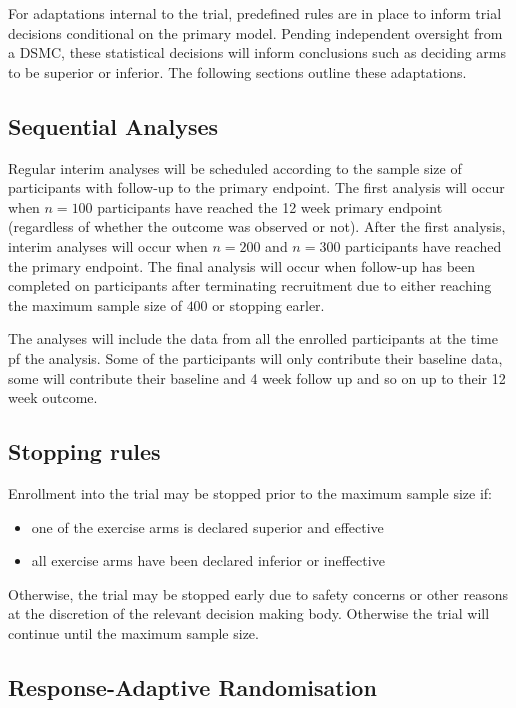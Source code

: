\documentclass[11pt,parskip=half-]{scrartcl}
\providecommand{\tightlist}{%
  \setlength{\itemsep}{0pt}\setlength{\parskip}{0pt}}
\begin{document}
For adaptations internal to the trial, predefined rules are in place to inform trial decisions conditional on the primary model. Pending independent oversight from a DSMC, these statistical decisions will inform conclusions such as deciding arms to be superior or inferior. The following sections outline these adaptations.

\subsection{Sequential Analyses}\label{sequential-analyses}

Regular interim analyses will be scheduled according to the sample size of participants with follow-up to the primary endpoint. The first analysis will occur when \(n=100\) participants have reached the 12 week primary endpoint (regardless of whether the outcome was observed or not). After the first analysis, interim analyses will occur when $n=200$ and $n=300$ participants have reached the primary endpoint. The final analysis will occur when follow-up has been completed on participants after terminating recruitment due to either reaching the maximum sample size of \(400\) or stopping earler.

The analyses will include the data from all the enrolled participants at the time pf the analysis. Some of the participants will only contribute their baseline data, some will contribute their baseline and 4 week follow up and so on up to their 12 week outcome.

\subsection{Stopping rules}\label{stopping-rules}

Enrollment into the trial may be stopped prior to the maximum sample size if:

\begin{itemize}\tightlist
  \item one of the exercise arms is declared superior and effective
  \item all exercise arms have been declared inferior or ineffective
\end{itemize}

Otherwise, the trial may be stopped early due to safety concerns or other reasons at the discretion of the relevant decision making body. Otherwise the trial will continue until the maximum sample size.

\subsection{Response-Adaptive Randomisation}\label{sec:response-adaptive-randomisation}
\end{document}
